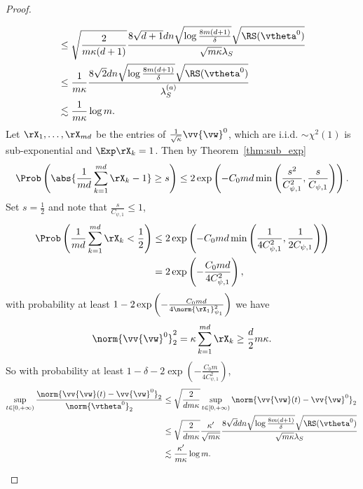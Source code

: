 \documentclass{article}
\begin{document}
\begin{proof}
\begin{enumerate}[(a)]
\begin{equation}
\begin{aligned}
                       & \leq  \sqrt{\frac{2}{m\kappa(d+1)}} \frac{8\sqrt{d+1}dn\sqrt{\log\frac{8m(d+1)}{\delta}}\sqrt{\RS(\vtheta^0)}}{\sqrt{m\kappa}\lambda_S} \\
                       & \leq \frac{1}{m\kappa}\frac{8\sqrt{2}dn\sqrt{\log\frac{8m(d+1)}{\delta}}\sqrt{\RS(\vtheta^0)}}{\lambda_S^{(a)}}                         \\
                       & \lesssim \frac{1}{m\kappa}\log m.
                  \end{aligned}
              \end{equation}
              Let $\rX_1, \ldots, \rX_{md}$ be the entries of $\frac{1}{\sqrt{\kappa}}\vv{\vw}^0$, which are i.i.d. $\sim\chi^2(1)$ is sub-exponential and $\Exp\rX_k=1$. Then by Theorem~\ref{thm:sub_exp}
              \begin{equation}
                  \Prob\left(\abs{\frac{1}{md}\sum_{k=1}^{md}\rX_k-1}\geq s\right)\leq 2\exp\left(-C_0 md \min\left(\frac{s^2}{C^2_{\psi,1}},\frac{s}{C_{\psi,1}}\right)\right).
              \end{equation}
              Set $s=\frac{1}{2}$ and note that $\frac{s}{C_{\psi,1}}\leq 1$,
              \begin{equation}
                  \begin{aligned}
                      \Prob\left(\frac{1}{md}\sum_{k=1}^{md}\rX_k<\frac{1}{2}\right)
                       & \leq 2\exp\left(-C_0 md \min\left(\frac{1}{4C^2_{\psi,1}},\frac{1}{2C_{\psi,1}}\right)\right) \\
                       & =2\exp\left(-\frac{C_0md}{4C^2_{\psi,1}}\right),
                  \end{aligned}
              \end{equation}
              with probability at least $1-2\exp\left(-\frac{C_0md}{4\norm{\rX_1}^2_{\psi_1}}\right)$ we have
              \begin{equation}
                  \norm{\vv{\vw}^0}^2_2=\kappa\sum_{k=1}^{md}\rX_k\geq\frac{d}{2}m\kappa.
              \end{equation}
              So with probability at least $1-\delta-2\exp\left(-\frac{C_0m}{4C^2_{\psi,1}}\right)$,
              \begin{equation}
                  \begin{aligned}
                      \sup\limits_{t\in[0,+\infty)}\frac{\norm{\vv{\vw}(t)-\vv{\vw}^0}_2}{\norm{\vtheta^0}_2}
                       & \leq \sqrt{\frac{2}{dm\kappa}}\sup\limits_{t\in[0,+\infty)}\norm{\vv{\vw}(t)-\vv{\vw}^0}_2                                                                     \\
                       & \leq  \sqrt{\frac{2}{dm\kappa}}\frac{\kappa'}{\sqrt{m\kappa}}\frac{8\sqrt{d}dn\sqrt{\log\frac{8m(d+1)}{\delta}}\sqrt{\RS(\vtheta^0)}}{\sqrt{m\kappa}\lambda_S} \\
                       & \lesssim \frac{\kappa'}{m\kappa}\log m.
                  \end{aligned}
              \end{equation}
    \end{enumerate}
\end{proof}
\end{document}
